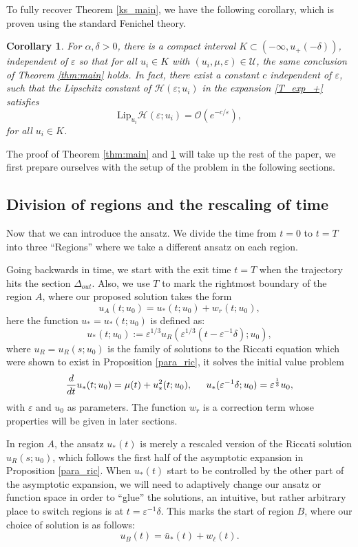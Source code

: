 \documentclass[letterpaper,11pt]{article}
\newcommand{\rmO}{\mathcal{O}}
\newcommand{\eps}{\varepsilon}
\numberwithin{equation}{section}
\theoremstyle{plain}
\newtheorem{corollary}[theorem]{Corollary}
\begin{document}
To fully recover Theorem \ref{ks_main}, we have  the following corollary, which is proven using the standard Fenichel theory.
\begin{corollary}\label{cor:main}
For $\alpha,\delta>0$, there is a compact interval $K \subset (-\infty, u_+(-\delta))$, independent of $\eps$ so that for all $u_i \in K$ with $(u_i,\mu,\eps) \in \mathcal{U}$, the same conclusion of Theorem \ref{thm:main} holds. In fact, there exist a constant $c$ independent of $\eps$, such that the Lipschitz constant of $\mathcal{H}(\eps;u_i)$ in the expansion \eqref{T_exp_+} satisfies
\[
\text{Lip}_{u_i} \mathcal{H}(\eps;u_i) = \rmO(e^{-c/\eps}),
\]
for all $u_i \in K$.
\end{corollary}

 The proof of Theorem \ref{thm:main} and \ref{cor:main} will take up the rest of the paper,  we first prepare ourselves with the setup of the problem in the following sections.

\subsection{Division of regions and the rescaling of time}\label{t_sigma}
Now that we can introduce the ansatz. We divide the time from $t=0$ to $t=T$ into three ``Regions'' where we take a different ansatz on each region. 

Going backwards in time, we start with the exit time $t=T$ when the trajectory hits the section $\Delta_{out}$. Also, we use $T$ to mark the rightmost boundary of the region $A$, where our proposed solution takes the form
\[
u_A(t; u_0) = u_*(t;u_0)  + w_r(t;u_0),
\]
here the function $u_* = u_*(t; u_0)$ is defined as:
\begin{equation}\label{urdef}
u_*(t; u_0) := \eps^{1/3}u_R(\eps^{1/3}(t-\eps^{-1}\delta); u_0),
\end{equation}
where $u_R=u_R(s; u_0)$ is the family of solutions to the Riccati equation which were shown to exist in Proposition \ref{para_ric}, it solves the initial value problem
\begin{equation}\label{ureq}
\frac{d}{dt}u_*(t; u_0) = \mu(t) + u_*^2(t; u_0), \hspace{0.2in} u_*(\eps^{-1}\delta; u_0) = \eps^{\frac{1}{3}} u_0,
\end{equation}
with $\eps$ and $u_0$ as parameters.  The function $w_r$ is a correction term whose properties will be given in later sections. 

In region $A$, the ansatz $u_*(t)$ is merely a rescaled version of the Riccati solution $u_R(s; u_0)$, which follows the first half of the asymptotic expansion in Proposition \ref{para_ric}. When $u_*(t)$ start to be controlled by the other part of the asymptotic expansion, we will need to adaptively change our ansatz or function space in order to ``glue'' the solutions, an intuitive, but rather arbitrary place to switch regions is at $t = \eps^{-1} \delta$. This marks the start of region $B$, where our choice of solution is as follows:
 \[ 
 u_B(t) = \bar{u}_*(t)  +w_\ell(t).
\]
\end{document}
